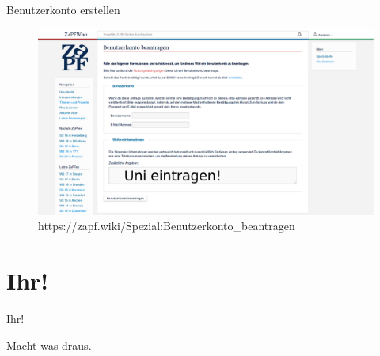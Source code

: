 \documentclass[compress,]{beamer}
\begin{document}
\begin{frame}{Benutzerkonto erstellen}
 \begin{figure}
    \centering
    \includegraphics[scale=0.15]{ZaPFWiki_2.pdf}

    \caption{https://zapf.wiki/Spezial:Benutzerkonto\_beantragen}
  \end{figure}

\end{frame}


\section{Ihr!}

\begin{frame}{Ihr!}

  Macht was draus. 

\end{frame}
\end{document}
